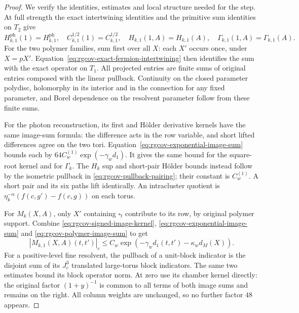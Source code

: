 \begin{proof}
We verify the identities, estimates and local structure
needed for the step.
At full strength the exact intertwining identities and
the primitive sum identities on $T_2$ give
\[
 H_{k,1}^{\mathrm{ph}}(1)=H_{k,1}^{\mathrm{ph}},\quad
 C_{k,1}^{1/2}(1)=C_{k,1}^{1/2},\quad
 H_{k,1}(1,A)=H_{k,1}(A),\quad
 \Gamma_{k,1}(1,A)=\Gamma_{k,1}(A).
\]
For the two polymer families, sum first over all $X$:
each $X'$ occurs once, under $X=pX'$.
Equation~\eqref{eq:rgcov-exact-fermion-intertwining}
then identifies the sum with the exact operator on $T_1$.
All projected entries are finite sums of original entries
composed with the linear pullback. Continuity on the
closed parameter polydisc, holomorphy in its interior and
in the connection for any fixed parameter, and Borel
dependence on the resolvent parameter follow from these
finite sums.

For the photon reconstruction, its first and H\"older
derivative kernels have the same image-sum formula:
the difference acts in the row variable, and short
lifted differences agree on the two tori.
Equation~\eqref{eq:rgcov-exponential-image-sum} bounds
each by $64C_w^{(1)}\exp(-\gamma_wd_1)$.
It gives the same bound for the square-root kernel
and for $\Gamma_k$.
The $H_k$ sup and short-pair H\"older bounds instead
follow by the isometric pullback in
\eqref{eq:rgcov-pullback-pairing}; their constant is
$C_w^{(1)}$. A short pair and its six paths lift
identically. An intracluster quotient is
$\eta_k^{-\alpha}(f(c,g')-f(c,g))$ on each torus.

For $M_k(X,A)$, only $X'$ containing $\square_t$
contribute to its row, by original polymer support.
Combine \eqref{eq:rgcov-signed-image-kernel},
\eqref{eq:rgcov-exponential-image-sum} and
\eqref{eq:rgcov-polymer-image-sum} to get
\[
 |M_{k,1}(X,A)(t,t')|_c
     \le C_w\exp(-\gamma_wd_1(t,t')-\kappa_wd_M(X)).
\]
For a positive-level fine resolvent, the pullback of
a unit-block indicator is the disjoint sum of its
$J_c^3$ translated large-torus block indicators.
The same two estimates bound its block operator
norm. At zero use its chamber kernel directly:
the original factor $(1+y)^{-1}$ is common to all
terms of both image sums and remains on the right.
All column weights are unchanged, so no further
factor $48$ appears.


\end{proof}
